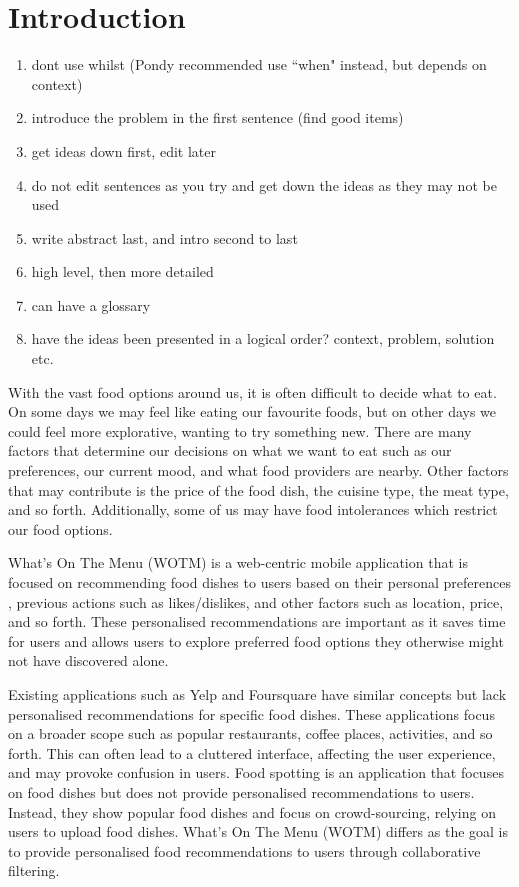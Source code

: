 \chapter{Introduction}\label{C:intro}

\begin{enumerate}
 \item dont use whilst (Pondy recommended use ``when" instead, but depends on context)
 \item introduce the problem in the first sentence (find good items)
 \item get ideas down first, edit later
 \item do not edit sentences as you try and get down the ideas as they may not be used
 \item write abstract last, and intro second to last
 \item high level, then more detailed 
 \item can have a glossary
 \item have the ideas been presented in a logical order? context, problem, solution etc.
\end{enumerate}

With the vast food options around us, it is often difficult to decide what to eat. On some days we may feel like eating our favourite foods, but on other days we could feel more explorative, wanting to try something new. There are many factors that determine our decisions on what we want to eat such as our preferences, our current mood, and what food providers are nearby. Other factors that may contribute is the price of the food dish, the cuisine type, the meat type, and so forth. Additionally, some of us may have food intolerances which restrict our food options.

What’s On The Menu (WOTM) is a web-centric mobile application that is focused on recommending food dishes to users based on their personal preferences , previous actions such as likes/dislikes, and other factors such as location, price, and so forth. These personalised recommendations are important as it saves time for users and allows users to explore preferred food options they otherwise might not have discovered alone. 

Existing applications such as Yelp and Foursquare have similar concepts but lack personalised recommendations for specific food dishes. These applications focus on a broader scope such as popular restaurants, coffee places, activities, and so forth. This can often lead to a cluttered interface, affecting the user experience, and may provoke confusion in users. Food spotting is an application that focuses on food dishes but does not provide personalised recommendations to users. Instead, they show popular food dishes and focus on crowd-sourcing, relying on users to upload food dishes. What's On The Menu (WOTM) differs as the goal is to provide personalised food recommendations to users through collaborative filtering. 

